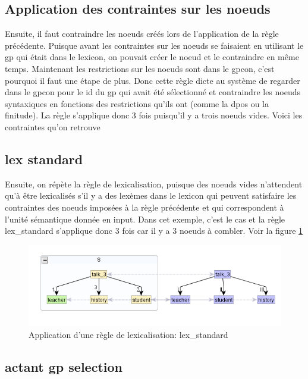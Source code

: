 \subsection{Application des contraintes sur les noeuds}
Ensuite, il faut contraindre les noeuds créés lors de l'application de la règle précédente. Puisque avant les contraintes sur les noeuds se faisaient en utilisant le gp qui était dans le lexicon, on pouvait créer le noeud et le contraindre en même temps. Maintenant les restrictions sur les noeuds sont dans le gpcon, c'est pourquoi il faut une étape de plus. Donc cette règle dicte au système de regarder dans le gpcon pour le id du gp qui avait été sélectionné et contraindre les noeuds syntaxiques en fonctions des restrictions qu'ils ont (comme la dpos ou la finitude). La règle s'applique donc 3 fois puisqu'il y a trois noeuds vides. Voici les contraintes qu'on retrouve 

\subsection{lex standard}
Ensuite, on répète la règle de lexicalisation, puisque des noeuds vides n'attendent qu'à être lexicalisés s'il y a des lexèmes dans le lexicon qui peuvent satisfaire les contraintes des noeuds imposées à la règle précédente et qui correspondent à l'unité sémantique donnée en input. Dans cet exemple, c'est le cas et la règle lex\_standard s'applique donc 3 fois car il y a 3 noeuds à combler. Voir la figure \ref{deroulement3}

\begin{figure}[htb]
	\centering
	\includegraphics[width=1\textwidth, trim = {0cm 0cm 0cm 0cm},clip]{ch6/figs/lex.png}
	\caption{Application d'une règle de lexicalisation: lex\_standard}
	\label{deroulement3}
\end{figure}

\subsection{actant gp selection}

